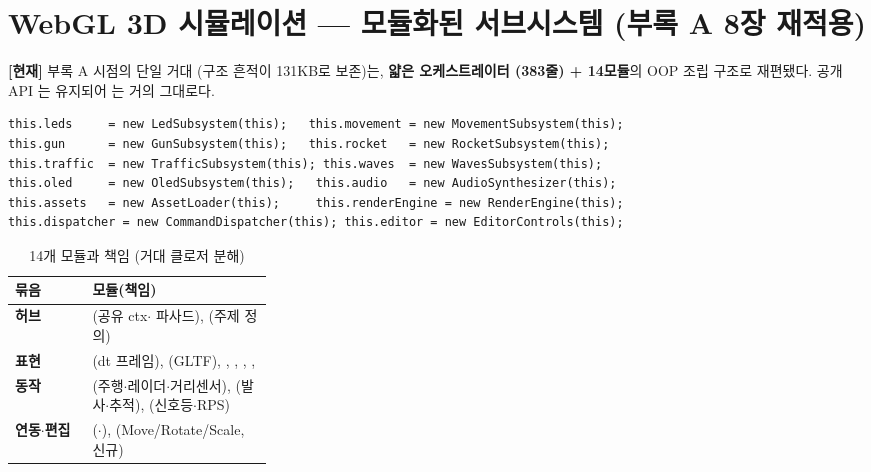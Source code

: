 \section{WebGL 3D 시뮬레이션 --- 모듈화된 서브시스템 (부록 A 8장 재적용)}
\textbf{[현재]} 부록 A 시점의 단일 거대 (구조 흔적이
 131KB로 보존)는, \textbf{얇은 오케스트레이터 
(383줄) +  14모듈}의 OOP 조립 구조로 재편됐다. 공개 API
는 유지되어 는 거의 그대로다.

\begin{verbatim}
this.leds     = new LedSubsystem(this);   this.movement = new MovementSubsystem(this);
this.gun      = new GunSubsystem(this);   this.rocket   = new RocketSubsystem(this);
this.traffic  = new TrafficSubsystem(this); this.waves  = new WavesSubsystem(this);
this.oled     = new OledSubsystem(this);   this.audio   = new AudioSynthesizer(this);
this.assets   = new AssetLoader(this);     this.renderEngine = new RenderEngine(this);
this.dispatcher = new CommandDispatcher(this); this.editor = new EditorControls(this);
\end{verbatim}

\begin{table}[htbp]\centering\small
\caption{ 14개 모듈과 책임 (거대 클로저  분해)}
\renewcommand{\arraystretch}{1.2}
\begin{tabularx}{\linewidth}{@{}>{\sffamily\bfseries}L{0.30\linewidth} >{\raggedright\arraybackslash}X@{}}
\toprule
\sffamily 묶음 & \sffamily 모듈(책임) \\
\midrule
허브 & (공유 ctx$\cdot$ 파사드), (주제 정의) \\
표현 & (dt 프레임), (GLTF), , , , ,  \\
동작 & (주행$\cdot$레이더$\cdot$거리센서), (발사$\cdot$추적), (신호등$\cdot$RPS) \\
연동$\cdot$편집 & ($\cdot$), (Move/Rotate/Scale, 신규) \\
\bottomrule
\end{tabularx}
\end{table}

